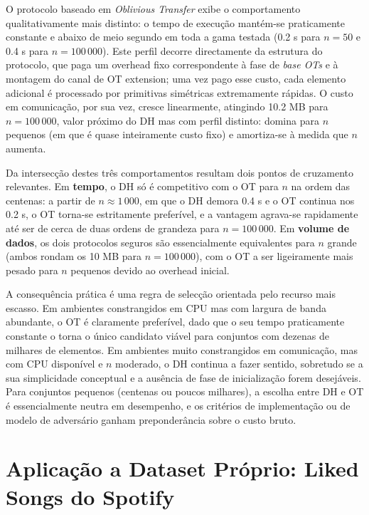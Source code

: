 O protocolo baseado em \emph{Oblivious Transfer} exibe o comportamento qualitativamente mais distinto: o tempo de execução mantém-se praticamente constante e abaixo de meio segundo em toda a gama testada (0.2 s para $n = 50$ e 0.4 s para $n = 100\,000$). Este perfil decorre directamente da estrutura do protocolo, que paga um overhead fixo correspondente à fase de \emph{base OTs} e à montagem do canal de OT extension; uma vez pago esse custo, cada elemento adicional é processado por primitivas simétricas extremamente rápidas. O custo em comunicação, por sua vez, cresce linearmente, atingindo 10.2 MB para $n = 100\,000$, valor próximo do DH mas com perfil distinto: domina para $n$ pequenos (em que é quase inteiramente custo fixo) e amortiza-se à medida que $n$ aumenta.

Da intersecção destes três comportamentos resultam dois pontos de cruzamento relevantes. Em \textbf{tempo}, o DH só é competitivo com o OT para $n$ na ordem das centenas: a partir de $n \approx 1\,000$, em que o DH demora 0.4 s e o OT continua nos 0.2 s, o OT torna-se estritamente preferível, e a vantagem agrava-se rapidamente até ser de cerca de duas ordens de grandeza para $n = 100\,000$. Em \textbf{volume de dados}, os dois protocolos seguros são essencialmente equivalentes para $n$ grande (ambos rondam os 10 MB para $n = 100\,000$), com o OT a ser ligeiramente mais pesado para $n$ pequenos devido ao overhead inicial.

A consequência prática é uma regra de selecção orientada pelo recurso mais escasso. Em ambientes constrangidos em CPU mas com largura de banda abundante, o OT é claramente preferível, dado que o seu tempo praticamente constante o torna o único candidato viável para conjuntos com dezenas de milhares de elementos. Em ambientes muito constrangidos em comunicação, mas com CPU disponível e $n$ moderado, o DH continua a fazer sentido, sobretudo se a sua simplicidade conceptual e a ausência de fase de inicialização forem desejáveis. Para conjuntos pequenos (centenas ou poucos milhares), a escolha entre DH e OT é essencialmente neutra em desempenho, e os critérios de implementação ou de modelo de adversário ganham preponderância sobre o custo bruto.


\clearpage
\section{Aplicação a Dataset Próprio: Liked Songs do Spotify}
\label{sec:step4}

